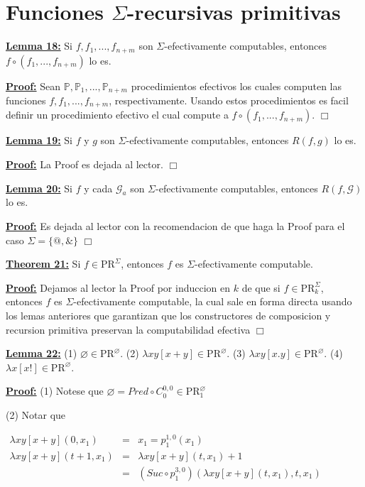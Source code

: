 \section{Funciones $\Sigma$-recursivas primitivas}

  \textbf{\underline{Lemma 18:}} Si \(f,f_{1},...,f_{n+m}\) son \(\Sigma \)-efectivamente computables, entonces \( f\circ (f_{1},...,f_{n+m})\) lo es.

  \textbf{\underline{Proof:}} Sean \(\mathbb{P},\mathbb{P}_{1},...,\mathbb{P}_{n+m}\) procedimientos efectivos los cuales computen las funciones \(f,f_{1},...,f_{n+m}\), respectivamente. Usando estos procedimientos es facil definir un procedimiento efectivo el cual compute a \(f\circ (f_{1},...,f_{n+m})\). \(\Box\)

  \textbf{\underline{Lemma 19:}} Si \(f\) y \(g\) son \(\Sigma \)-efectivamente computables, entonces \(R(f,g)\) lo es.

  \textbf{\underline{Proof:}} La Proof es dejada al lector. \(\Box\)

  \textbf{\underline{Lemma 20:}} Si \(f\) y cada \(\mathcal{G}_{a}\) son \(\Sigma \)-efectivamente computables, entonces \(R(f,\mathcal{G})\) lo es.

  \textbf{\underline{Proof:}} Es dejada al lector con la recomendacion de que haga la Proof para el caso \( \Sigma =\{@,\& \}\) \(\Box\)

  \textbf{\underline{Theorem 21:}} Si \(f\in \mathrm{PR}^{\Sigma }\), entonces \(f\) es \(\Sigma \)-efectivamente computable.

  \textbf{\underline{Proof:}} Dejamos al lector la Proof por induccion en \(k\) de que si \(f\in \mathrm{PR} _{k}^{\Sigma }\), entonces \(f\) es \(\Sigma \)-efectivamente computable, la cual sale en forma directa usando los lemas anteriores que garantizan que los constructores de composicion y recursion primitiva preservan la computabilidad efectiva \(\Box\)

  \textbf{\underline{Lemma 22:}}
  (1) \(\varnothing \in \mathrm{PR}^{\varnothing }\).
  (2) \(\lambda xy\left[ x+y\right] \in \mathrm{PR}^{\varnothing }\).
  (3) \(\lambda xy\left[ x.y\right] \in \mathrm{PR}^{\varnothing }\).
  (4) \(\lambda x\left[ x!\right] \in \mathrm{PR}^{\varnothing }\).

  \textbf{\underline{Proof:}} (1) Notese que \(\varnothing =Pred\circ C_{0}^{0,0}\in \mathrm{PR} _{1}^{\varnothing }\)

  (2) Notar que

  \(\displaystyle \begin{array}{rcl} \lambda xy\left[ x+y\right] (0,x_{1}) & =& x_{1}=p_{1}^{1,0}(x_{1}) \\ \lambda xy\left[ x+y\right] (t+1,x_{1}) & =& \lambda xy\left[ x+y\right] (t,x_{1})+1 \\ & =& \left( Suc\circ p_{1}^{3,0}\right) \left( \lambda xy\left[ x+y\right] (t,x_{1}),t,x_{1}\right) \end{array} \)

